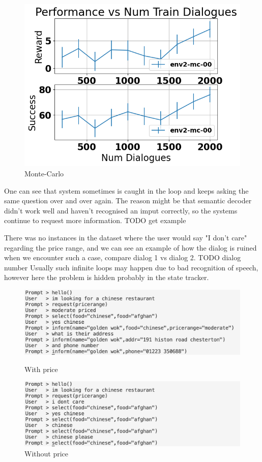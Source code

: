 \documentclass[12pt,titlepage,a4paper]{article}
\begin{document}
\begin{figure}[!htb]
      \includegraphics[width=\linewidth]{env2-CamRestaurants-mc.png}
      \caption{Monte-Carlo}
    \endminipage
\end{figure}

One can see that system sometimes is caught in the loop and keeps asking the same question over and over again. The reason might be that semantic decoder didn't work well and haven't recognised an imput correctly, so the systems continue to request more information. TODO get example

There was no instances in the dataset where the user would say "I don't care" regarding the price range, and we can see an example of how the dialog is ruined when we encounter such a case, compare dialog 1 vs dialog 2. TODO dialog number Usually such infinite loops may happen due to bad recognition of speech, however here the problem is hidden probably in the state tracker. 


\begin{figure}[!htb]
      \includegraphics[width=\linewidth]{with_price.png}
      \caption{With price}
    \endminipage\hfill
      \includegraphics[width=\linewidth]{without_price.png}
      \caption{Without price}
    \endminipage
\end{figure}
\end{document}
